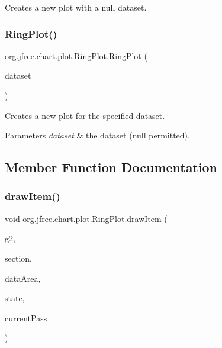Creates a new plot with a {\ttfamily null} dataset. \mbox{\label{classorg_1_1jfree_1_1chart_1_1plot_1_1_ring_plot_a3336da43f51c25f1aec4d2a021574503}} 
\subsubsection{\texorpdfstring{Ring\+Plot()}{RingPlot()}\hspace{0.1cm}{\footnotesize\ttfamily [2/2]}}
{\footnotesize\ttfamily org.\+jfree.\+chart.\+plot.\+Ring\+Plot.\+Ring\+Plot (\begin{DoxyParamCaption}\item[{\mbox{\hyperlink{interfaceorg_1_1jfree_1_1data_1_1general_1_1_pie_dataset}{Pie\+Dataset}}}]{dataset }\end{DoxyParamCaption})}

Creates a new plot for the specified dataset.


\begin{DoxyParams}{Parameters}
{\em dataset} & the dataset ({\ttfamily null} permitted). \\
\hline
\end{DoxyParams}


\subsection{Member Function Documentation}
\mbox{\label{classorg_1_1jfree_1_1chart_1_1plot_1_1_ring_plot_a931487f50cbc9b440fcd8e4913440e93}} 
\subsubsection{\texorpdfstring{draw\+Item()}{drawItem()}}
{\footnotesize\ttfamily void org.\+jfree.\+chart.\+plot.\+Ring\+Plot.\+draw\+Item (\begin{DoxyParamCaption}\item[{Graphics2D}]{g2,  }\item[{int}]{section,  }\item[{Rectangle2D}]{data\+Area,  }\item[{\mbox{\hyperlink{classorg_1_1jfree_1_1chart_1_1plot_1_1_pie_plot_state}{Pie\+Plot\+State}}}]{state,  }\item[{int}]{current\+Pass }\end{DoxyParamCaption})\hspace{0.3cm}{\ttfamily [protected]}}

